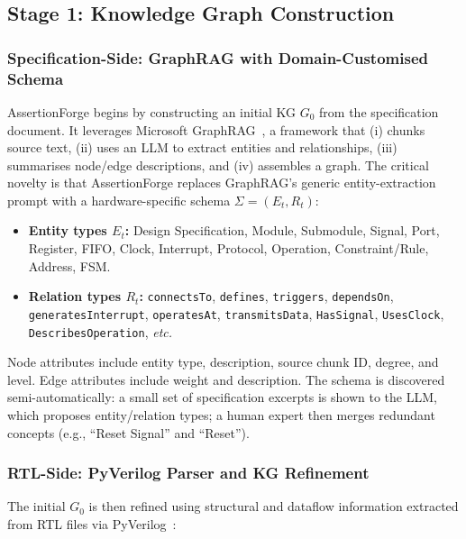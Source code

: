 \documentclass[12pt,a4paper]{article}
\begin{document}
\subsection{Stage 1: Knowledge Graph Construction}

\subsubsection{Specification-Side: GraphRAG with Domain-Customised Schema}

AssertionForge begins by constructing an initial KG $G_0$ from the
specification document. It leverages Microsoft GraphRAG~\cite{graphrag}, a
framework that (i) chunks source text, (ii) uses an LLM to extract entities
and relationships, (iii) summarises node/edge descriptions, and (iv) assembles
a graph. The critical novelty is that AssertionForge replaces GraphRAG's
generic entity-extraction prompt with a hardware-specific schema $\Sigma =
(E_t, R_t)$:

\begin{itemize}[noitemsep]
  \item \textbf{Entity types $E_t$:} Design Specification, Module, Submodule,
        Signal, Port, Register, FIFO, Clock, Interrupt, Protocol, Operation,
        Constraint/Rule, Address, FSM.
  \item \textbf{Relation types $R_t$:} \texttt{connectsTo}, \texttt{defines},
        \texttt{triggers}, \texttt{dependsOn}, \texttt{generatesInterrupt},
        \texttt{operatesAt}, \texttt{transmitsData}, \texttt{HasSignal},
        \texttt{UsesClock}, \texttt{DescribesOperation}, \textit{etc.}
\end{itemize}

Node attributes include entity type, description, source chunk ID, degree, and
level. Edge attributes include weight and description. The schema is discovered
semi-automatically: a small set of specification excerpts is shown to the LLM,
which proposes entity/relation types; a human expert then merges redundant
concepts (e.g., ``Reset Signal'' and ``Reset'').

\subsubsection{RTL-Side: PyVerilog Parser and KG Refinement}

The initial $G_0$ is then refined using structural and dataflow information
extracted from RTL files via PyVerilog~\cite{pyverilog}:
\end{document}

